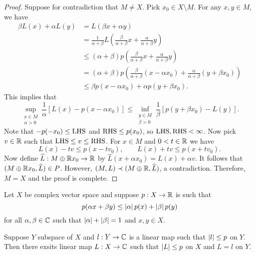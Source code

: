 \documentclass[a4paper]{article}
\begin{document}
\begin{proof}
Suppose for contradiction that $M \neq X$. Pick $x_0 \in X 
\setminus M$. For any $x, y \in M$, we have 
\[
\begin{aligned}
\beta L(x) + \alpha L(y) 
&= L(\beta x + \alpha y) \\ 
&= \frac{1}{\alpha + \beta} L \left( 
  \frac{\beta}{\alpha + \beta} x + \frac{\alpha}{\alpha + \beta} y 
 \right)\\ 
& \leq (\alpha + \beta) p \left( 
  \frac{\beta}{\alpha + \beta} x + \frac{\alpha}{\alpha + \beta} y 
 \right)\\ 
&= (\alpha + \beta) p \left( 
  \frac{\beta}{\alpha + \beta} (x - \alpha x_0)
  + \frac{\alpha}{\alpha + \beta} (y + \beta x_0) 
 \right)\\ 
& \leq \beta p(x - \alpha x_0) + \alpha p(y + \beta x_0).
\end{aligned}
\]
This implies that 
\[
\sup_{\substack{x \in M \\ \alpha > 0}} 
\frac{1}{\alpha} \left[ L(x) - p(x - \alpha x_0) \right] 
\leq \inf_{\substack{y \in M \\ \beta > 0}} 
\frac{1}{\beta} \left[ p(y + \beta x_0) - L(y) \right].
\]
Note that $-p(-x_0) \leq \operatorname{LHS}$ and $\operatorname{RHS} \leq p(x_0)$, so 
$\operatorname{LHS}, \operatorname{RHS} < \infty$. Now pick $v \in \mathbb{R}$ such that 
$\operatorname{LHS} \leq v \leq \operatorname{RHS}$. For $x \in M$ and $0 < t \in \mathbb{R}$ we have 
\[
L(x) - tv \leq p(x - t v_0), \qquad 
L(x) + tv \leq p(x + t v_0). 
\]
Now define $\widehat{L}: M \oplus \mathbb{R} x_0 \to \mathbb{R}$ by 
$\hat{L}(x + \alpha x_0) = L(x) + \alpha v$. It follows that 
$(M \oplus \mathbb{R} x_0 , \widehat{L}) \in P$. However, $(M, L) \prec 
(M \oplus \mathbb{R}, \widehat{L})$, a contradiction. Therefore, $M = X$ 
and the proof is complete.

\end{proof}

\begin{thm}
Let $X$ be complex vector space and suppose $p: X \to \mathbb{R}$ 
is such that 
\[
p(\alpha x + \beta y) \leq \left\lvert \alpha\right\rvert p(x) + \left\lvert \beta\right\rvert p(y)
\]
for all $\alpha, \beta \in \mathbb{C}$ such that $\left\lvert \alpha\right\rvert + 
\left\lvert \beta\right\rvert=1$ and $x, y \in X$.

Suppose $Y$ subspace of $X$ and $l: Y \to \mathbb{C}$ is a linear map 
such that $\left\lvert l\right\rvert \leq p$ on $Y$. Then there exsits linear map 
$L: X \to \mathbb{C}$ such that $\left\lvert L\right\rvert \leq p$ on $X$ and  
$L = l$ on $Y$.
\end{thm}
\end{document}
